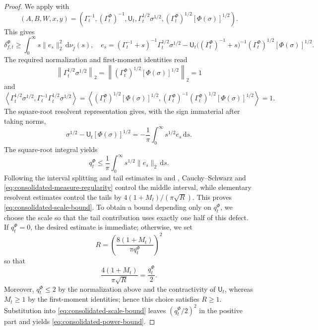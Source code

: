 \documentclass[11pt]{article}
\theoremstyle{remark}
\newcommand{\1}{\mathbbm{1}}
\begin{document}
\begin{proof}
We apply  with
\begin{equation}
 (A,B,W,x,y)=\left(
 \Gamma_t^{-1},(\Gamma_t^\Phi)^{-1},\mathsf U_t,
 \Gamma_t^{1/2}\sigma^{1/2},
 (\Gamma_t^\Phi)^{1/2}[\Phi(\sigma)]^{1/2}\right).
\end{equation}
This gives
\begin{equation}
 \delta_{f,t}^{\Phi}\geq
 \int_0^\infty s\lVert e_s\rVert_2^2
 \,\mathrm d\nu_{\widetilde f}(s),
\quad
 e_s=(\Gamma_t^{-1}+s)^{-1}\Gamma_t^{1/2}\sigma^{1/2}
 -\mathsf U_t\bigl((\Gamma_t^\Phi)^{-1}+s\bigr)^{-1}
 (\Gamma_t^\Phi)^{1/2}[\Phi(\sigma)]^{1/2}.
\end{equation}
The required normalization and first-moment identities read
\begin{equation}
 \left\lVert\Gamma_t^{1/2}\sigma^{1/2}\right\rVert_2
 =\left\lVert(\Gamma_t^\Phi)^{1/2}
 [\Phi(\sigma)]^{1/2}\right\rVert_2=1
\end{equation}
and
\begin{equation}
 \left\langle\Gamma_t^{1/2}\sigma^{1/2},
 \Gamma_t^{-1}\Gamma_t^{1/2}\sigma^{1/2}\right\rangle
 =\left\langle(\Gamma_t^\Phi)^{1/2}[\Phi(\sigma)]^{1/2},
 (\Gamma_t^\Phi)^{-1}(\Gamma_t^\Phi)^{1/2}
 [\Phi(\sigma)]^{1/2}\right\rangle=1.
\end{equation}
The square-root resolvent representation
\cite[Example~2.3 and Eq.~(7.3)]{carlen2018recovery} gives, with the
sign immaterial after taking norms,
\begin{equation}
 \sigma^{1/2}-\mathsf U_t[\Phi(\sigma)]^{1/2}
 =-\frac1\pi\int_0^\infty s^{1/2}e_s\,\mathrm ds.
\end{equation}
The square-root integral yields
\begin{equation}
 q_t^\Phi\leq\frac1\pi
 \int_0^\infty s^{1/2}\lVert e_s\rVert_2\,\mathrm ds.
\end{equation}
Following the interval splitting and tail estimates in
\cite[proof of Theorem~4.2 and Section~7]{carlen2018recovery} and
\cite[proof of Theorem~6.1]{bluhm2020strengthened}, Cauchy--Schwarz and
\eqref{eq:consolidated-measure-regularity} control the middle
interval, while elementary resolvent estimates control the tails by
$4(1+M_t)/(\pi\sqrt R)$.  This proves
\eqref{eq:consolidated-scale-bound}.  To obtain a bound depending
only on $q_t^\Phi$, we choose the scale so that the tail contribution
uses exactly one half of this defect.  If $q_t^\Phi=0$, the desired
estimate is immediate; otherwise, we set
\begin{equation}
 R=\left(\frac{8(1+M_t)}{\pi q_t^\Phi}\right)^2
\end{equation}
so that
\begin{equation}
 \frac{4(1+M_t)}{\pi\sqrt R}=\frac{q_t^\Phi}{2}.
\end{equation}
Moreover, $q_t^\Phi\leq2$ by the normalization above and the
contractivity of $\mathsf U_t$, whereas $M_t\geq1$ by the first-moment
identities; hence this choice satisfies $R\geq1$.  Substitution into
\eqref{eq:consolidated-scale-bound} leaves
$(q_t^\Phi/2)^2$ in the positive part and yields
\eqref{eq:consolidated-power-bound}.
\end{proof}
\end{document}
